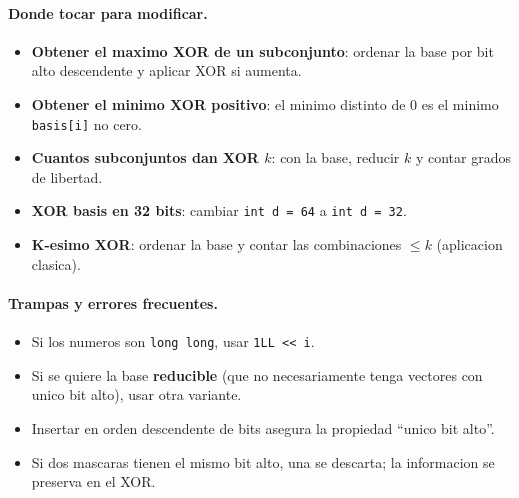 \paragraph{Donde tocar para modificar.}
\begin{itemize}\setlength\itemsep{0pt}
	\item \textbf{Obtener el maximo XOR de un subconjunto}: ordenar la base por bit alto descendente y aplicar XOR si aumenta.
	\item \textbf{Obtener el minimo XOR positivo}: el minimo distinto de 0 es el minimo \texttt{basis[i]} no cero.
	\item \textbf{Cuantos subconjuntos dan XOR $k$}: con la base, reducir $k$ y contar grados de libertad.
	\item \textbf{XOR basis en 32 bits}: cambiar \texttt{int d = 64} a \texttt{int d = 32}.
	\item \textbf{K-esimo XOR}: ordenar la base y contar las combinaciones $\le k$ (aplicacion clasica).
\end{itemize}

\paragraph{Trampas y errores frecuentes.}
\begin{itemize}\setlength\itemsep{0pt}
	\item Si los numeros son \texttt{long long}, usar \texttt{1LL << i}.
	\item Si se quiere la base \textbf{reducible} (que no necesariamente tenga vectores con unico bit alto), usar otra variante.
	\item Insertar en orden descendente de bits asegura la propiedad ``unico bit alto''.
	\item Si dos mascaras tienen el mismo bit alto, una se descarta; la informacion se preserva en el XOR.
\end{itemize}

